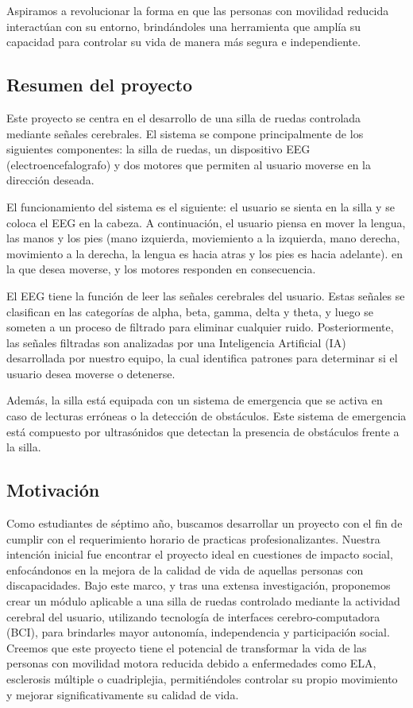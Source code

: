 \documentclass{article}
\begin{document}
Aspiramos a revolucionar la forma en que las personas con movilidad reducida interactúan con su entorno, brindándoles una herramienta que amplía su capacidad para controlar su vida de manera más segura e independiente.

\subsection{Resumen del proyecto}
Este proyecto se centra en el desarrollo de una silla de ruedas controlada mediante señales cerebrales. El sistema se compone principalmente de los siguientes componentes: la silla de ruedas, un dispositivo EEG (electroencefalografo) y dos motores que permiten al usuario moverse en la dirección deseada.

El funcionamiento del sistema es el siguiente: el usuario se sienta en la silla y se coloca el EEG en la cabeza. A continuación, el usuario piensa en mover la lengua, las manos y los pies (mano izquierda, moviemiento a la izquierda, mano derecha, movimiento a la derecha, la lengua es hacia atras y los pies es hacia adelante).  en la que desea moverse, y los motores responden en consecuencia.

El EEG tiene la función de leer las señales cerebrales del usuario. Estas señales se clasifican en las categorías de alpha, beta, gamma, delta y theta, y luego se someten a un proceso de filtrado para eliminar cualquier ruido. Posteriormente, las señales filtradas son analizadas por una Inteligencia Artificial (IA) desarrollada por nuestro equipo, la cual identifica patrones para determinar si el usuario desea moverse o detenerse.

Además, la silla está equipada con un sistema de emergencia que se activa en caso de lecturas erróneas o la detección de obstáculos. Este sistema de emergencia está compuesto por ultrasónidos que detectan la presencia de obstáculos frente a la silla.

\subsection{Motivación}
Como estudiantes de séptimo año, buscamos desarrollar un proyecto con el fin de cumplir con el requerimiento horario de practicas profesionalizantes. Nuestra intención inicial fue encontrar el proyecto ideal en cuestiones de impacto social, enfocándonos en la mejora de la calidad de vida de aquellas personas con discapacidades. Bajo este marco, y tras una extensa investigación, proponemos crear un módulo aplicable a una silla de ruedas controlado mediante la actividad cerebral del usuario, utilizando tecnología de interfaces cerebro-computadora (BCI), para brindarles mayor autonomía, independencia y participación social.   Creemos que este proyecto tiene el potencial de transformar la vida de las personas con movilidad motora reducida debido a enfermedades como ELA, esclerosis múltiple o cuadriplejia, permitiéndoles controlar su propio movimiento y mejorar significativamente su calidad de vida.
\end{document}
